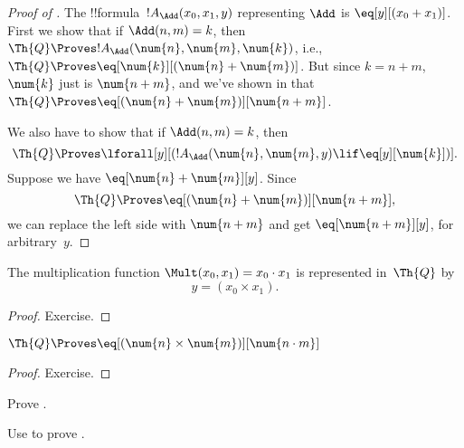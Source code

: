 \documentclass[../../../include/open-logic-section]{subfiles}
\begin{document}
\begin{proof}[Proof of ]
The !!{formula}~$!A_\Add(x_0, x_1, y)$ representing $\Add$ is
$\eq[y][(x_0 + x_1)]$. First we show that if $\Add(n, m) = k$, then
$\Th{Q} \Proves !A_\Add(\num{n}, \num{m}, \num{k})$, i.e., $\Th{Q}
\Proves \eq[\num{k}][(\num{n} + \num{m})]$. But since $k = n + m$,
$\num{k}$ just is $\num{n+m}$, and we've shown in
 that $\Th{Q} \Proves \eq[(\num{n} +
  \num{m})][\num{n+m}]$.

We also have to show that if $\Add(n, m) = k$, then
\[
\Th{Q} \Proves \lforall[y][(!A_\Add(\num{n}, \num{m}, y) \lif
  \eq[y][\num{k}])].
\]
Suppose we have $\eq[\num{n} + \num{m}][y]$. Since
\[
\Th{Q} \Proves \eq[(\num{n}+\num{m})][\num{n+m}],
\]
we can replace the left side with $\num{n+m}$ and get
$\eq[\num{n+m}][y]$, for arbitrary~$y$.
\end{proof}

\begin{prop}
The multiplication function $\Mult(x_0, x_1) = x_0 \cdot x_1$ is represented
in~$\Th{Q}$ by
\[
y = (x_0 \times x_1).
\]
\end{prop}

\begin{proof} Exercise. \end{proof}

\begin{lem}
$\Th{Q} \Proves \eq[(\num{n} \times \num{m})][\num{n \cdot m}]$
\end{lem}

\begin{proof} Exercise. \end{proof}

\begin{prob}
Prove .
\end{prob}

\begin{prob}
Use  to prove
.
\end{prob}
\end{document}
